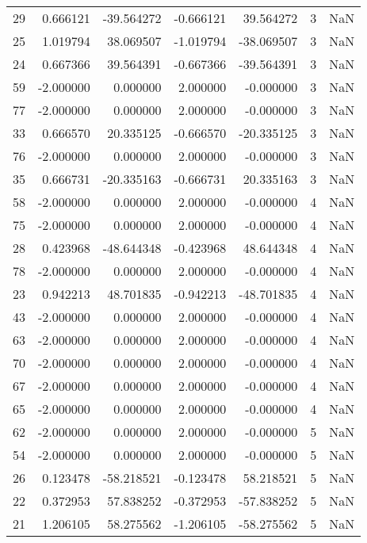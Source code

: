 \begin{tabular}{rrrrrrr}
29 &  0.666121 & -39.564272 & -0.666121 &   39.564272 &           3 & NaN \\
25 &  1.019794 &  38.069507 & -1.019794 &  -38.069507 &           3 & NaN \\
24 &  0.667366 &  39.564391 & -0.667366 &  -39.564391 &           3 & NaN \\
59 & -2.000000 &   0.000000 &  2.000000 &   -0.000000 &           3 & NaN \\
77 & -2.000000 &   0.000000 &  2.000000 &   -0.000000 &           3 & NaN \\
33 &  0.666570 &  20.335125 & -0.666570 &  -20.335125 &           3 & NaN \\
76 & -2.000000 &   0.000000 &  2.000000 &   -0.000000 &           3 & NaN \\
35 &  0.666731 & -20.335163 & -0.666731 &   20.335163 &           3 & NaN \\
58 & -2.000000 &   0.000000 &  2.000000 &   -0.000000 &           4 & NaN \\
75 & -2.000000 &   0.000000 &  2.000000 &   -0.000000 &           4 & NaN \\
28 &  0.423968 & -48.644348 & -0.423968 &   48.644348 &           4 & NaN \\
78 & -2.000000 &   0.000000 &  2.000000 &   -0.000000 &           4 & NaN \\
23 &  0.942213 &  48.701835 & -0.942213 &  -48.701835 &           4 & NaN \\
43 & -2.000000 &   0.000000 &  2.000000 &   -0.000000 &           4 & NaN \\
63 & -2.000000 &   0.000000 &  2.000000 &   -0.000000 &           4 & NaN \\
70 & -2.000000 &   0.000000 &  2.000000 &   -0.000000 &           4 & NaN \\
67 & -2.000000 &   0.000000 &  2.000000 &   -0.000000 &           4 & NaN \\
65 & -2.000000 &   0.000000 &  2.000000 &   -0.000000 &           4 & NaN \\
62 & -2.000000 &   0.000000 &  2.000000 &   -0.000000 &           5 & NaN \\
54 & -2.000000 &   0.000000 &  2.000000 &   -0.000000 &           5 & NaN \\
26 &  0.123478 & -58.218521 & -0.123478 &   58.218521 &           5 & NaN \\
22 &  0.372953 &  57.838252 & -0.372953 &  -57.838252 &           5 & NaN \\
21 &  1.206105 &  58.275562 & -1.206105 &  -58.275562 &           5 & NaN \\

\end{tabular}
